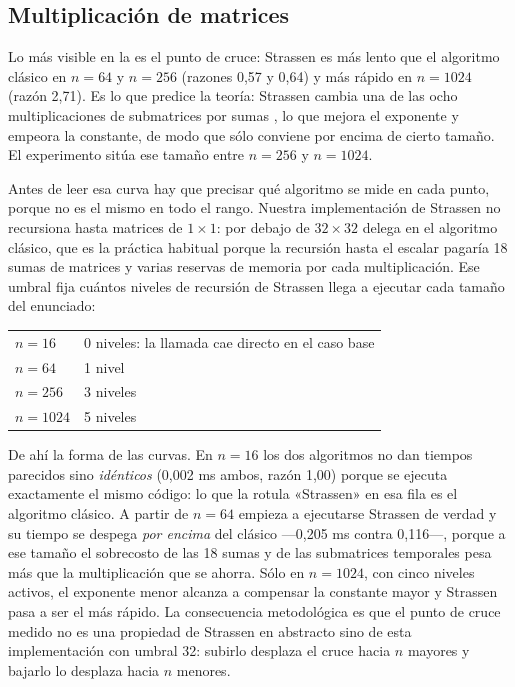 \subsection{Multiplicación de matrices}

Lo más visible en la  es el punto de cruce: Strassen es
más lento que el algoritmo clásico en $n = 64$ y $n = 256$ (razones 0,57 y 0,64)
y más rápido en $n = 1024$ (razón 2,71). Es lo que predice la teoría: Strassen
cambia una de las ocho multiplicaciones de submatrices por sumas
\cite{strassen1969}, lo que mejora el exponente y empeora la constante, de modo
que sólo conviene por encima de cierto tamaño. El experimento sitúa ese tamaño
entre $n = 256$ y $n = 1024$.

Antes de leer esa curva hay que precisar qué algoritmo se mide en cada punto,
porque no es el mismo en todo el rango. Nuestra implementación de Strassen no
recursiona hasta matrices de $1 \times 1$: por debajo de $32 \times 32$ delega en
el algoritmo clásico, que es la práctica habitual \cite{higham2002} porque la
recursión hasta el escalar pagaría 18 sumas de matrices y varias reservas de
memoria por cada multiplicación. Ese umbral fija cuántos niveles de recursión de
Strassen llega a ejecutar cada tamaño del enunciado:

\begin{center}
\begin{tabular}{ll}
\hline
$n = 16$   & 0 niveles: la llamada cae directo en el caso base \\
$n = 64$   & 1 nivel \\
$n = 256$  & 3 niveles \\
$n = 1024$ & 5 niveles \\
\hline
\end{tabular}
\end{center}

De ahí la forma de las curvas. En $n = 16$ los dos algoritmos no dan tiempos
parecidos sino \emph{idénticos} (0,002 ms ambos, razón 1,00) porque se ejecuta
exactamente el mismo código: lo que la  rotula «Strassen» en esa
fila es el algoritmo clásico. A partir de $n = 64$ empieza a ejecutarse Strassen
de verdad y su tiempo se despega \emph{por encima} del clásico ---0,205 ms contra
0,116---, porque a ese tamaño el sobrecosto de las 18 sumas y de las submatrices
temporales pesa más que la multiplicación que se ahorra. Sólo en $n = 1024$, con
cinco niveles activos, el exponente menor alcanza a compensar la constante mayor
y Strassen pasa a ser el más rápido. La consecuencia metodológica es que el punto
de cruce medido no es una propiedad de Strassen en abstracto sino de esta
implementación con umbral 32: subirlo desplaza el cruce hacia $n$ mayores y
bajarlo lo desplaza hacia $n$ menores.

